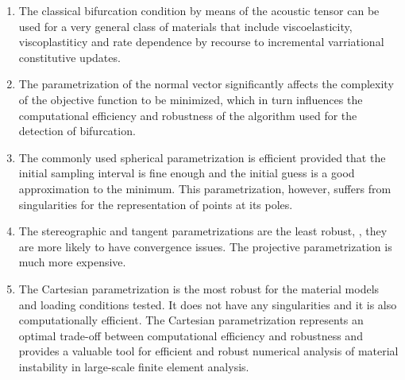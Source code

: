 \documentclass[12pt]{article}
\numberwithin{equation}{section}
\begin{document}
\begin{enumerate}
\item The classical bifurcation condition by means of the acoustic
  tensor can be used for a very general class of materials that
  include viscoelasticity, viscoplastiticy and rate dependence by
  recourse to incremental varriational constitutive updates.

\item The parametrization of the normal vector significantly affects
  the complexity of the objective function to be minimized, which in
  turn influences the computational efficiency and robustness of the
  algorithm used for the detection of bifurcation.

\item The commonly used spherical parametrization is efficient
  provided that the initial sampling interval is fine enough and the
  initial guess is a good approximation to the minimum. This
  parametrization, however, suffers from singularities for the
  representation of points at its poles.

\item The stereographic and tangent parametrizations are the least
  robust, \ie, they are more likely to have convergence issues. The
  projective parametrization is much more expensive.

\item The Cartesian parametrization is the most robust for the
  material models and loading conditions tested. It does not have any
  singularities and it is also computationally efficient. The
  Cartesian parametrization represents an optimal trade-off between
  computational efficiency and robustness and provides a valuable tool
  for efficient and robust numerical analysis of material instability
  in large-scale finite element analysis.
\end{enumerate}



\end{document}
